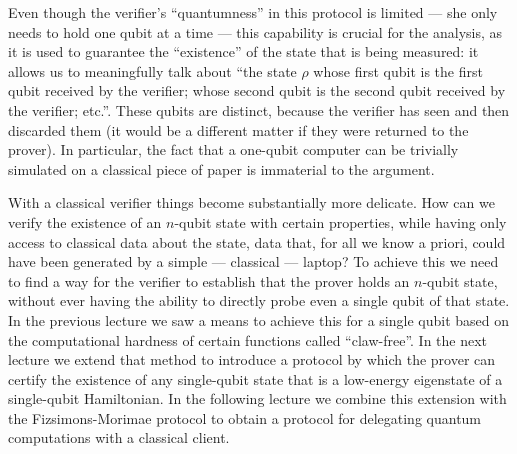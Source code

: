 Even though the verifier's ``quantumness'' in this protocol is limited --- she only needs to hold one qubit at a time --- this capability is crucial for the analysis, as it is used to guarantee the ``existence'' of the state that is being measured: it allows us to meaningfully talk about ``the state $\rho$ whose first qubit is the first qubit received by the verifier; whose second qubit is the second qubit received by the verifier; etc.''. These qubits are distinct, because the verifier has seen and then discarded them (it would be a different matter if they were returned to the prover). In particular, the fact that a one-qubit computer can be trivially simulated on a classical piece of paper is immaterial to the argument.

With a classical verifier things become substantially more delicate. How can we verify the existence of an $n$-qubit state with certain properties, while having only access to classical data about the state, data that, for all we know a priori, could have been generated by a simple --- classical --- laptop? To achieve this we need to find a way for the verifier to establish that the prover holds an $n$-qubit state, without ever having the ability to directly probe even a single qubit of that state. In the previous lecture we saw a means to achieve this for a single qubit based on the computational hardness of certain functions called ``claw-free''. In the next lecture we extend that method to introduce a protocol by which the prover can certify the existence of any single-qubit state that is a low-energy eigenstate of a single-qubit Hamiltonian. In the following lecture we combine this extension with the Fizsimons-Morimae protocol to obtain a protocol for delegating quantum computations with a classical client. 

